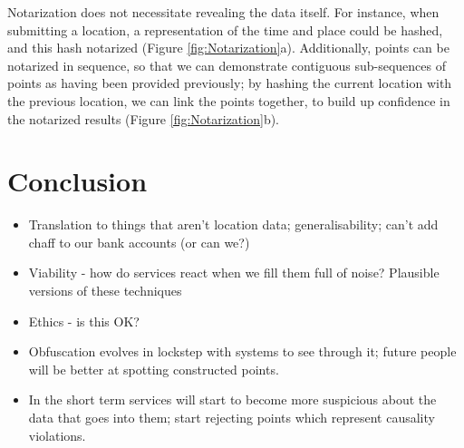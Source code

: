 \documentclass{IOS-Book-Article}     %
\begin{document}
Notarization does not necessitate revealing the data itself. For instance,
when submitting a location, a representation of the time and place could be
hashed, and this hash notarized (Figure \ref{fig:Notarization}a). Additionally,
points can be notarized in sequence, so that we can demonstrate contiguous sub-sequences 
of points as having been provided previously; by
hashing the current location with the previous location, we can link the points
together, to build up confidence in the notarized results (Figure
\ref{fig:Notarization}b).

\section{Conclusion}

\begin{itemize}
  \item Translation to things that aren't location data; generalisability; can't
  add chaff to our bank accounts (or can we?)
  \item Viability - how do services react when we fill them full of noise?
  Plausible versions of these techniques
  \item Ethics - is this OK?
  \item Obfuscation evolves in lockstep with systems to see through it; future
  people will be better at spotting constructed points.
  \item In the short term services will start to become more suspicious about
  the data that goes into them; start rejecting points which represent causality
  violations.
\end{itemize}




\end{document}
